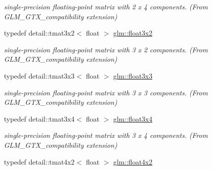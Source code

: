 \begin{DoxyCompactItemize}
\begin{DoxyCompactList}\small\item\em single-\/precision floating-\/point matrix with 2 x 4 components. (From G\+L\+M\+\_\+\+G\+T\+X\+\_\+compatibility extension) \end{DoxyCompactList}\item 
\hypertarget{group__gtx__compatibility_gaa16300622ef2d73a00a6a88289349fff}{}typedef detail\+::tmat3x2$<$ float $>$ \hyperlink{group__gtx__compatibility_gaa16300622ef2d73a00a6a88289349fff}{glm\+::float3x2}\label{group__gtx__compatibility_gaa16300622ef2d73a00a6a88289349fff}

\begin{DoxyCompactList}\small\item\em single-\/precision floating-\/point matrix with 3 x 2 components. (From G\+L\+M\+\_\+\+G\+T\+X\+\_\+compatibility extension) \end{DoxyCompactList}\item 
\hypertarget{group__gtx__compatibility_gaed16356f07f357b2c2a0427f3840f7fb}{}typedef detail\+::tmat3x3$<$ float $>$ \hyperlink{group__gtx__compatibility_gaed16356f07f357b2c2a0427f3840f7fb}{glm\+::float3x3}\label{group__gtx__compatibility_gaed16356f07f357b2c2a0427f3840f7fb}

\begin{DoxyCompactList}\small\item\em single-\/precision floating-\/point matrix with 3 x 3 components. (From G\+L\+M\+\_\+\+G\+T\+X\+\_\+compatibility extension) \end{DoxyCompactList}\item 
\hypertarget{group__gtx__compatibility_ga1e516ea7f46532af1c43254d221c35b0}{}typedef detail\+::tmat3x4$<$ float $>$ \hyperlink{group__gtx__compatibility_ga1e516ea7f46532af1c43254d221c35b0}{glm\+::float3x4}\label{group__gtx__compatibility_ga1e516ea7f46532af1c43254d221c35b0}

\begin{DoxyCompactList}\small\item\em single-\/precision floating-\/point matrix with 3 x 4 components. (From G\+L\+M\+\_\+\+G\+T\+X\+\_\+compatibility extension) \end{DoxyCompactList}\item 
\hypertarget{group__gtx__compatibility_gaa88b02301dae283e289c3951c0fe7f8d}{}typedef detail\+::tmat4x2$<$ float $>$ \hyperlink{group__gtx__compatibility_gaa88b02301dae283e289c3951c0fe7f8d}{glm\+::float4x2}\label{group__gtx__compatibility_gaa88b02301dae283e289c3951c0fe7f8d}


\end{DoxyCompactItemize}
